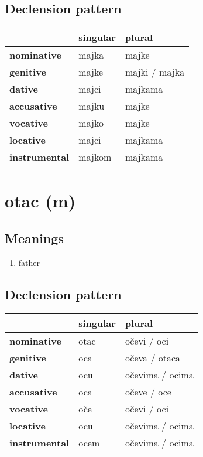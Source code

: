 \subsection*{Declension pattern}
\begin{tabularx}{\linewidth}{Xll}
\toprule
{} & singular &         plural \\
\midrule
\textbf{nominative  } &    majka &          majke \\
\textbf{genitive    } &    majke &  majki / majka \\
\textbf{dative      } &    majci &        majkama \\
\textbf{accusative  } &    majku &          majke \\
\textbf{vocative    } &    majko &          majke \\
\textbf{locative    } &    majci &        majkama \\
\textbf{instrumental} &   majkom &        majkama \\
\bottomrule
\end{tabularx}

\filbreak
\section{otac (m)}
\subsection*{Meanings}
\begin{enumerate}
\item father
\end{enumerate}
\subsection*{Declension pattern}
\begin{tabularx}{\linewidth}{Xll}
\toprule
{} & singular &           plural \\
\midrule
\textbf{nominative  } &     otac &      očevi / oci \\
\textbf{genitive    } &      oca &    očeva / otaca \\
\textbf{dative      } &      ocu &  očevima / ocima \\
\textbf{accusative  } &      oca &      očeve / oce \\
\textbf{vocative    } &      oče &      očevi / oci \\
\textbf{locative    } &      ocu &  očevima / ocima \\
\textbf{instrumental} &     ocem &  očevima / ocima \\
\bottomrule
\end{tabularx}

